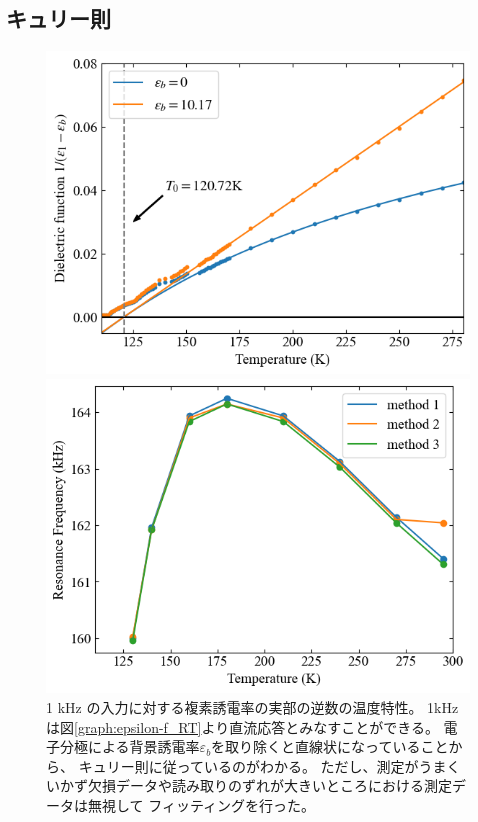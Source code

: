 \documentclass[9pt,dvipdfmx,a4paper]{jsarticle}
\begin{document}
\subsection{キュリー則}
\begin{figure}[t]
    \centering
    \begin{minipage}[t]{0.48\columnwidth}
        \centering
        \includegraphics[width = \columnwidth]{1epsilon-Temp.png}
        \caption{\small{1 kHz の入力に対する複素誘電率の実部の逆数の温度特性。
        1kHz は図\ref{graph:epsilon-f_RT}より直流応答とみなすことができる。
        電子分極による背景誘電率\(\varepsilon_b\)を取り除くと直線状になっていることから、
        キュリー則に従っているのがわかる。
        ただし、測定がうまくいかず欠損データや読み取りのずれが大きいところにおける測定データは無視して
        フィッティングを行った。}}
        \label{graph:1epsilon-Temp}
    \end{minipage}
    \hfill
    \begin{minipage}[t]{0.48\columnwidth}
        \centering
        \includegraphics[width = \columnwidth]{ResF-Temp.png}

\end{minipage}
\end{figure}
\end{document}
